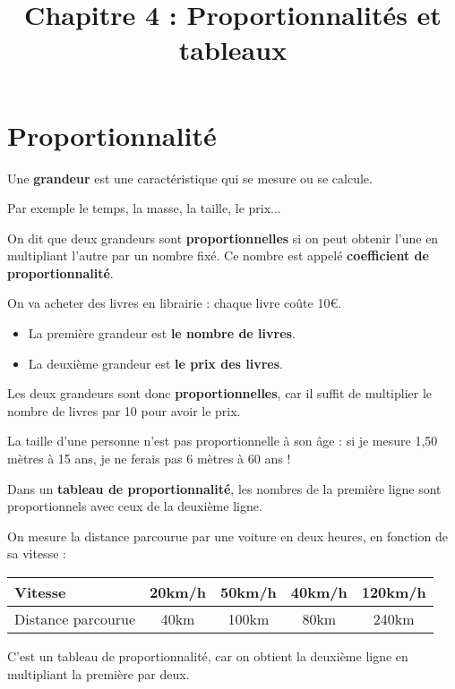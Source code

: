 \documentclass[a4paper,11pt]{article}
\title{Chapitre 4 : Proportionnalités et tableaux}
\date{}
\author{}
\begin{document}
\maketitle

\section{Proportionnalité}

\begin{vocabulaire}[Grandeur]
	Une \textbf{grandeur} est une caractéristique qui se mesure ou se calcule.

	Par exemple le temps, la masse, la taille, le prix...
\end{vocabulaire}

\begin{cours}
	On dit que deux grandeurs sont \textbf{proportionnelles} si on peut obtenir l'une en multipliant l'autre par un nombre fixé. Ce nombre est appelé \textbf{coefficient de proportionnalité}.
\end{cours}

\begin{exemple}
	On va acheter des livres en librairie : chaque livre coûte 10€.

	\begin{itemize}
		\item La première grandeur est \textbf{le nombre de livres}.
		\item La deuxième grandeur est \textbf{le prix des livres}.
	\end{itemize}

	Les deux grandeurs sont donc \textbf{proportionnelles}, car il suffit de multiplier le nombre de livres par 10 pour avoir le prix.
\end{exemple}

\begin{exemple}
	La taille d'une personne n'est pas proportionnelle à son âge : si je mesure 1,50 mètres à 15 ans, je ne ferais pas 6 mètres à 60 ans !
\end{exemple}

\begin{cours}
	Dans un \textbf{tableau de proportionnalité}, les nombres de la première ligne sont proportionnels avec ceux de la deuxième ligne.
\end{cours}

\begin{exemple}
	On mesure la distance parcourue par une voiture en deux heures, en fonction de sa vitesse : \vspace{0.5em}

	\begin{tabular}{|l|c|c|c|c|}
		\hline
		Vitesse            & 20km/h & 50km/h & 40km/h & 120km/h \\ \hline
		Distance parcourue & 40km   & 100km  & 80km   & 240km   \\ \hline
	\end{tabular}

	C'est un tableau de proportionnalité, car on obtient la deuxième ligne en multipliant la première par deux.
\end{exemple}
\end{document}
